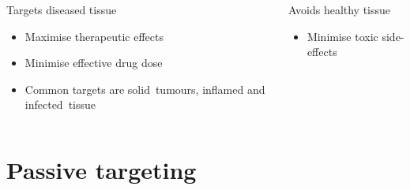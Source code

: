 \documentclass[aspectratio=169,compress]{beamer}
\newcommand*{\autotitle}{\subsecname\hfill\textbf{\small\secname}}
\begin{document}
\begin{frame}[fragile]{\autotitle}
\begin{columns}
      \begin{block}{Targets diseased tissue}
        \begin{itemize}
          \item Maximise therapeutic effects
          \item Minimise effective drug dose
          \item Common targets are \alert{solid~tumours}, \alert{inflamed} and \alert{infected~tissue}
        \end{itemize}
      \end{block}

      \begin{block}{Avoids healthy tissue}
        \begin{itemize}
          \item Minimise toxic side-effects
        \end{itemize}
      \end{block}

  \end{columns}
\end{frame}

\section{Passive targeting}
\end{document}
